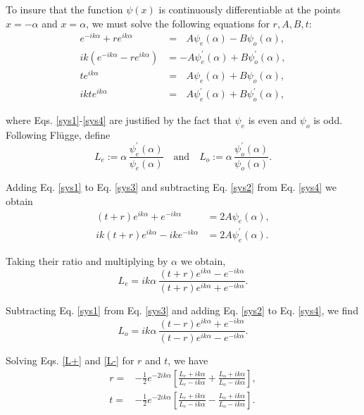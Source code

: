 \documentclass{article}
\numberwithin{equation}{section}
\begin{document}
To insure that the function $\psi(x)$ is continuously differentiable at the points $x=-\alpha$ and $x=\alpha$, we must solve the following equations for $r, A, B, t$:
\begin{align}
e^{-ik\alpha} + re^{ik\alpha}&=\,\,\,\,A \psi_e(\alpha) - B \psi_o(\alpha),\label{sys1}\\
ik(e^{-ik\alpha} - re^{ik\alpha})&=-A\psi_e^\prime(\alpha) + B \psi_o^\prime(\alpha),\label{sys2}\\
te^{ik\alpha}&= \,\,\,\,A\psi_e(\alpha) + B \psi_o(\alpha),\label{sys3}\\
ikte^{ik\alpha}&= \,\,\,\,A\psi_e^\prime(\alpha) + B \psi_o^\prime(\alpha),\label{sys4}
\end{align}

where Eqs. \eqref{sys1}-\eqref{sys4}  are justified by the fact that $\psi_e$ is even and $\psi_o$ is odd.  Following Fl\"ugge, define
\begin{equation}
L_{\displaystyle e}:=\alpha\,\frac{\psi_e^\prime(\alpha)}{\psi_e(\alpha)}\quad \text{and} \quad L_{\displaystyle o}:=\alpha\,\frac{\psi_o^\prime(\alpha)}{\psi_o(\alpha)}. \label{L+L-}
\end{equation}

Adding Eq. \eqref{sys1} to Eq. \eqref{sys3} and subtracting Eq. \eqref{sys2} from Eq. \eqref{sys4} we obtain
\begin{align}
 (t+r)e^{ik\alpha}+e^{-ik\alpha}&=2A\psi_e(\alpha),\label{A1}\\
ik(t+r)e^{ik\alpha}-ike^{-ik\alpha}&=2A\psi^{\prime}_e(\alpha).\label{A2}
\end{align}

Taking their ratio and multiplying by $\alpha$ we obtain,
\begin{equation}
L_{\displaystyle e}=ik\alpha\,\frac{(t+r)e^{ik\alpha}-e^{-ik\alpha}}{(t+r)e^{ik\alpha}+e^{-ik\alpha}}.\label{L+}
\end{equation}

Subtracting Eq. \eqref{sys1} from Eq. \eqref{sys3} and adding Eq. \eqref{sys2} to Eq. \eqref{sys4}, we find
\begin{equation}
L_{\displaystyle o}=ik\alpha\,\frac{(t-r)e^{ik\alpha}+e^{-ik\alpha}}{(t-r)e^{ik\alpha}-e^{-ik\alpha}}.\label{L-}
\end{equation}

Solving Eqs. \eqref{L+} and \eqref{L-} for $r$ and $t$, we have
\begin{align} 
r=&-\frac{1}{2}e^{-2ik\alpha}\left[\frac{L_{\displaystyle e} + ik\alpha}{L_{\displaystyle e} - ik\alpha}+\frac{L_{\displaystyle o}+ ik\alpha}{L_{\displaystyle o} - ik\alpha}\right],\label{r}\\
t=&-\frac{1}{2}e^{-2ik\alpha}\left[\frac{L_{\displaystyle e} + ik\alpha}{L_{\displaystyle e} - ik\alpha}-\frac{L_{\displaystyle o} + ik\alpha}{L_{\displaystyle o} - ik\alpha}\right].\label{t}
\end{align}
\end{document}
